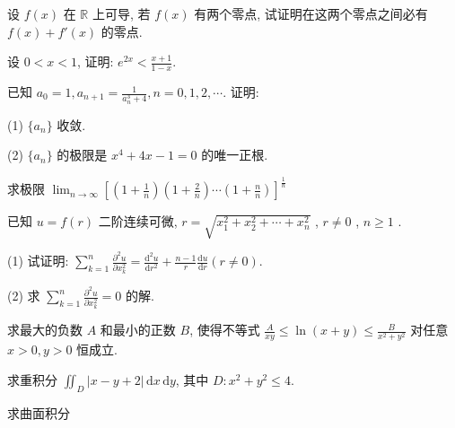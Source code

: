 设 $f(x)$ 在 $\mathbb{R}$ 上可导, 若 $f(x)$ 有两个零点, 试证明在这两个零点之间必有 $f(x) + f'(x)$ 的零点.\par
设 $0 < x < 1$, 证明: $e^{2x} < \frac{x + 1}{1 - x}$.\par
已知 $a_0 = 1, a_{n+1} = \frac{1}{a_n^3 + 4}, n = 0, 1, 2, \cdots$. 证明:\par
(1) $\{a_{n}\}$ 收敛.\par
(2) $\{a_{n}\}$ 的极限是 $x^{4} + 4x - 1 = 0$ 的唯一正根.\par
求极限  $\lim_{n\to\infty}\left[\left(1+\frac{1}{n}\right)\left(1+\frac{2}{n}\right)\cdots\left(1+\frac{n}{n}\right)\right]^{\frac{1}{n}}$\par
已知  $u = f(r)$  二阶连续可微,  $r = \sqrt{x_{1}^{2} + x_{2}^{2} + \cdots + x_{n}^{2}}$ ,  $r \neq 0$ ,  $n \geq 1$ .\par
(1) 试证明: $\sum_{k=1}^{n} \frac{\partial^2 u}{\partial x_k^2} = \frac{\mathrm{d}^2 u}{\mathrm{d}r^2} + \frac{n-1}{r} \frac{\mathrm{d}u}{\mathrm{d}r} (r \neq 0)$.\par
(2) 求 $\sum_{k=1}^{n} \frac{\partial^2 u}{\partial x_k^2} = 0$ 的解.\par
求最大的负数 $A$ 和最小的正数 $B$, 使得不等式 $\frac{A}{xy} \leq \ln (x + y) \leq \frac{B}{x^2 + y^2}$ 对任意 $x > 0, y > 0$ 恒成立.\par
求重积分 $\iint_{D} |x - y + 2| \, \mathrm{d}x \, \mathrm{d}y$, 其中 $D: x^2 + y^2 \leq 4$.\par
\par{}
求曲面积分\par
\nopagebreak[4]
